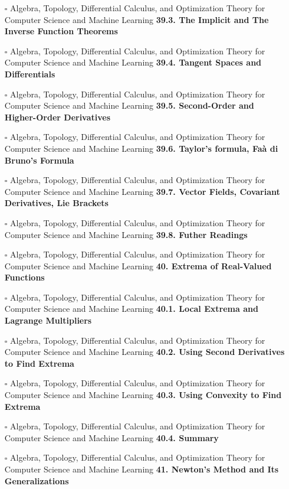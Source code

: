 \documentclass[a4, landscape, 12pt]{article}
\newcommand{\checkbox}{$\square$}%
\begin{document}
\begin{itemize}
{}
\item [\checkbox]  Algebra, Topology, Differential Calculus, and Optimization Theory for Computer Science and Machine Learning \textbf{ 39.3. The Implicit and The Inverse Function Theorems
}
\item [\checkbox]  Algebra, Topology, Differential Calculus, and Optimization Theory for Computer Science and Machine Learning \textbf{ 39.4. Tangent Spaces and Differentials
}
\item [\checkbox]  Algebra, Topology, Differential Calculus, and Optimization Theory for Computer Science and Machine Learning \textbf{ 39.5. Second-Order and Higher-Order Derivatives
}
\item [\checkbox]  Algebra, Topology, Differential Calculus, and Optimization Theory for Computer Science and Machine Learning \textbf{ 39.6. Taylor’s formula, Faà di Bruno's Formula 
}
\item [\checkbox]  Algebra, Topology, Differential Calculus, and Optimization Theory for Computer Science and Machine Learning \textbf{ 39.7. Vector Fields, Covariant Derivatives, Lie Brackets
}
\item [\checkbox]  Algebra, Topology, Differential Calculus, and Optimization Theory for Computer Science and Machine Learning \textbf{ 39.8. Futher Readings
}
\item [\checkbox]  Algebra, Topology, Differential Calculus, and Optimization Theory for Computer Science and Machine Learning \textbf{ 40. Extrema of Real-Valued Functions
}
\item [\checkbox]  Algebra, Topology, Differential Calculus, and Optimization Theory for Computer Science and Machine Learning \textbf{ 40.1. Local Extrema and Lagrange Multipliers
}
\item [\checkbox]  Algebra, Topology, Differential Calculus, and Optimization Theory for Computer Science and Machine Learning \textbf{ 40.2. Using Second Derivatives to Find Extrema
}
\item [\checkbox]  Algebra, Topology, Differential Calculus, and Optimization Theory for Computer Science and Machine Learning \textbf{ 40.3. Using Convexity to Find Extrema
}
\item [\checkbox]  Algebra, Topology, Differential Calculus, and Optimization Theory for Computer Science and Machine Learning \textbf{ 40.4. Summary
}
\item [\checkbox]  Algebra, Topology, Differential Calculus, and Optimization Theory for Computer Science and Machine Learning \textbf{ 41. Newton’s Method and Its Generalizations
}
\end{itemize}
\end{document}
